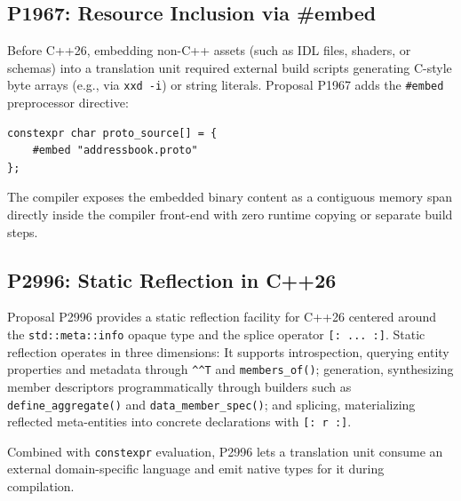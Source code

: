 \subsection{P1967: Resource Inclusion via \#embed}
Before C++26, embedding non-C++ assets (such as IDL files, shaders, or schemas) into a translation unit required external build scripts generating C-style byte arrays (e.g., via \texttt{xxd -i}) or string literals. Proposal P1967 \cite{p1967} adds the \texttt{\#embed} preprocessor directive:
\begin{lstlisting}[language=ModernC++]
constexpr char proto_source[] = {
    #embed "addressbook.proto"
};
\end{lstlisting}
The compiler exposes the embedded binary content as a contiguous memory span directly inside the compiler front-end with zero runtime copying or separate build steps.

\subsection{P2996: Static Reflection in C++26}
Proposal P2996 \cite{p2996} provides a static reflection facility for C++26 centered around the \texttt{std::meta::info} opaque type and the splice operator \texttt{[: ... :]}. Static reflection operates in three dimensions:
It supports introspection, querying entity properties and metadata through \texttt{\^{}\^{}T} and \texttt{members\_of()}; generation, synthesizing member descriptors programmatically through builders such as \texttt{define\_aggregate()} and \texttt{data\_member\_spec()}; and splicing, materializing reflected meta-entities into concrete declarations with \texttt{[: r :]}.

Combined with \texttt{constexpr} evaluation, P2996 lets a translation unit consume an external domain-specific language and emit native types for it during compilation.
